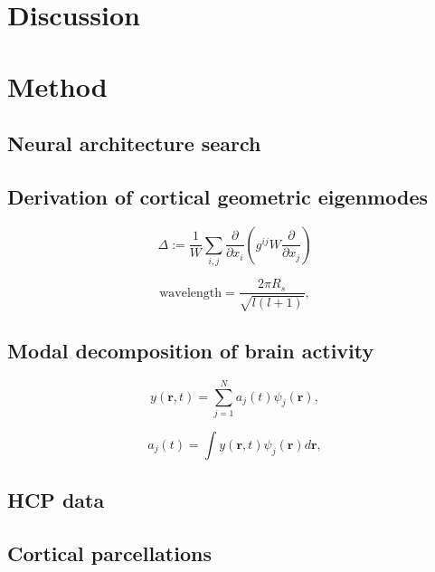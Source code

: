 \documentclass[sn-mathphys-num]{sn-jnl}%
\theoremstyle{thmstyleone}%
\theoremstyle{thmstyletwo}%
\theoremstyle{thmstylethree}%
\begin{document}
\section{Discussion}

\section{Method} \label{sec:method}

\subsection{Neural architecture search}

\subsection{Derivation of cortical geometric eigenmodes} \label{sec:derivation}


\begin{equation}\label{eq:surface_curvature}
	\Delta:=\frac{1}{W} \sum_{i,j} \frac{\partial}{\partial x_i} (g^{ij} W \frac{\partial}{\partial x_j})
\end{equation}


\begin{equation}
	\text{wavelength} = \frac{2 \pi R_s}
	{\sqrt{l(l+1)}},
\end{equation}


\subsection{Modal decomposition of brain activity} \label{sec:modal_decomposition}


\begin{equation}\label{eq:weighted_sum}
	y(\textbf{r}, t) = \sum_{j=1}^{N} a_j(t) \psi_j(\textbf{r}),
\end{equation}


\begin{equation}\label{eq:amplitudes}
	a_j(t) = \int y(\textbf{r}, t) \psi_j(\textbf{r}) d\textbf{r}, 
\end{equation}


\subsection{HCP data} \label{sec:HCP_data}


\subsection{Cortical parcellations} \label{sec:cortical_parcellations}
\end{document}
